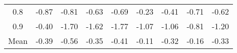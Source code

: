 \begin{longtable}{ | c || c | c | c | c | c | c | c || c |}
0.8 &  \cellcolor[HTML]{FFE7E7} -0.87 &  \cellcolor[HTML]{FFE7E7} -0.81 &  \cellcolor[HTML]{FFEFEF} -0.63 &  \cellcolor[HTML]{FFEFEF} -0.69 &  \cellcolor[HTML]{FFF7F7} -0.23 &  \cellcolor[HTML]{FFF7F7} -0.41 &  \cellcolor[HTML]{FFEFEF} -0.71 &  \cellcolor[HTML]{FFEFEF} -0.62 \\
0.9 &  \cellcolor[HTML]{FFF7F7} -0.40 &  \cellcolor[HTML]{FFD7D7} -1.70 &  \cellcolor[HTML]{FFD7D7} -1.62 &  \cellcolor[HTML]{FFCFCF} -1.77 &  \cellcolor[HTML]{FFE7E7} -1.07 &  \cellcolor[HTML]{FFE7E7} -1.06 &  \cellcolor[HTML]{FFE7E7} -0.81 &  \cellcolor[HTML]{FFDFDF} -1.20 \\
\hline
\hline
Mean  &  \cellcolor[HTML]{FFF7F7} -0.39 &  \cellcolor[HTML]{FFEFEF} -0.56 &  \cellcolor[HTML]{FFF7F7} -0.35 &  \cellcolor[HTML]{FFF7F7} -0.41 &  \cellcolor[HTML]{FFFFFF} -0.11 &  \cellcolor[HTML]{FFF7F7} -0.32 &  \cellcolor[HTML]{FFF7F7} -0.16 &  \cellcolor[HTML]{FFF7F7} -0.33 \\
\hline
\end{longtable}
